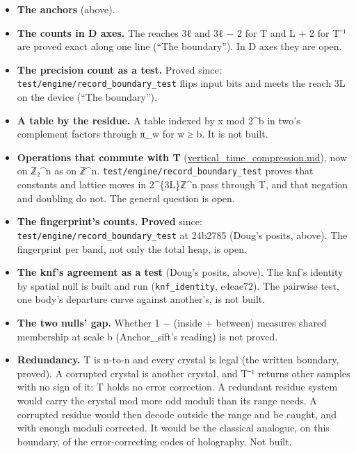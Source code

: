 \begin{itemize}
\item \textbf{The anchors} (above).
\item \textbf{The counts in D axes.} The reaches 3ℓ and 3ℓ − 2 for T and L + 2 for T⁻¹ are proved exact along one line (“The boundary”). In D axes they are open.
\item \textbf{The precision count as a test.} Proved since: \texttt{test/\allowbreak{}engine/\allowbreak{}record\_\allowbreak{}boundary\_\allowbreak{}test} flips input bits and meets the reach 3L on the device (“The boundary”).
\item \textbf{A table by the residue.} A table indexed by x mod 2\textasciicircum{}b in two's complement factors through π\_\allowbreak{}w for w ≥ b. It is not built.
\item \textbf{Operations that commute with T} (\hyperref[chap:vertical-time-compression]{vertical\_\allowbreak{}time\_\allowbreak{}compression.md}), now on ℤ₂\textasciicircum{}n as on ℤ\textasciicircum{}n. \texttt{test/\allowbreak{}engine/\allowbreak{}record\_\allowbreak{}boundary\_\allowbreak{}test} proves that constants and lattice moves in 2\textasciicircum{}\{3L\}ℤ\textasciicircum{}n pass through T, and that negation and doubling do not. The general question is open.
\item \textbf{The fingerprint's counts.} \textbf{Proved} since: \texttt{test/\allowbreak{}engine/\allowbreak{}record\_\allowbreak{}boundary\_\allowbreak{}test} at 24b2785 (Doug's posits, above). The fingerprint per band, not only the total heap, is open.
\item \textbf{The knf's agreement as a test} (Doug's posits, above). The knf's identity by spatial null is built and run (\texttt{knf\_\allowbreak{}identity}, e4eae72). The pairwise test, one body's departure curve against another's, is not built.
\item \textbf{The two nulls' gap.} Whether 1 − (inside + between) measures shared membership at scale b (Anchor\_\allowbreak{}sift's reading) is not proved.
\item \textbf{Redundancy.} T is n-to-n and every crystal is legal (the written boundary, proved). A corrupted crystal is another crystal, and T⁻¹ returns other samples with no sign of it: T holds no error correction. A redundant residue system would carry the crystal mod more odd moduli than its range needs. A corrupted residue would then decode outside the range and be caught, and with enough moduli corrected. It would be the classical analogue, on this boundary, of the error-correcting codes of holography. Not built.
\end{itemize}

